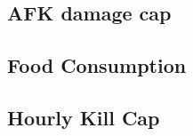         \subsection{AFK damage cap}
        \subsection{Food Consumption}
        \subsection{Hourly Kill Cap}
